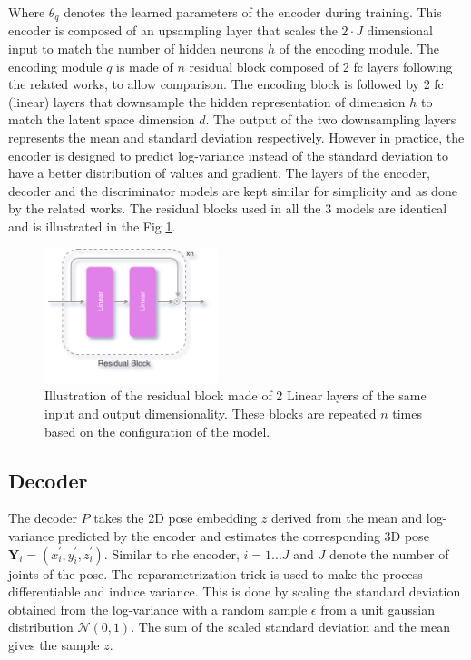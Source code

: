 Where $\theta_q$ denotes the learned parameters of the encoder during training. This encoder is composed of an upsampling layer that scales the $2\!\cdot\!J$ dimensional input to match the number of hidden neurons $h$ of the encoding module. The encoding module $q$ is made of $n$ residual block composed of 2 \ac{fc} layers following the related works, to allow comparison. The encoding block is followed by 2 \ac{fc} (linear) layers that downsample the hidden representation of dimension $h$ to match the latent space dimension $d$. The output of the two downsampling layers represents the mean and standard deviation respectively. However in practice, the encoder is designed to predict log-variance instead of the standard deviation to have a better distribution of values and gradient. The layers of the encoder, decoder and the discriminator models are kept similar for simplicity and as done by the related works. The residual blocks used in all the 3 models are identical and is illustrated in the Fig \ref{fig:residual_block}.

\begin{figure}[h] 
    \centering
    \includegraphics[width=0.45\textwidth]{figures/arch/res_block.png}
    \caption{Illustration of the residual block made of 2 Linear layers of the same input and output dimensionality. These blocks are repeated $n$ times based on the configuration of the model.
    }
    \label{fig:residual_block}
\end{figure}

\subsection{Decoder}
The decoder $P$ takes the 2D pose embedding $z$ derived from the mean and log-variance predicted by the encoder and estimates the corresponding 3D pose $\textbf{Y}_i = (x^\prime_i, y^\prime_i, z^\prime_i)$. Similar to rhe encoder, $i = 1 ... J$ and $J$ denote the number of joints of the pose. The reparametrization trick is used to make the process differentiable and induce variance. This is done by scaling the standard deviation obtained from the log-variance with a random sample $\epsilon$ from a unit gaussian distribution $\mathcal{N}(0,1)$. The sum of the scaled standard deviation and the mean gives the sample $z$.

